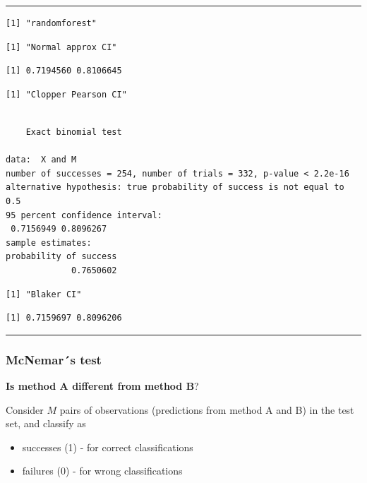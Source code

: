 \documentclass[
  letterpaper,
  DIV=11,
  numbers=noendperiod]{scrartcl}
\providecommand{\tightlist}{%
  \setlength{\itemsep}{0pt}\setlength{\parskip}{0pt}}\usepackage{longtable,booktabs,array}
\begin{document}
\begin{center}\rule{0.5\linewidth}{0.5pt}\end{center}

\footnotesize

\begin{verbatim}
[1] "randomforest"
\end{verbatim}

\begin{verbatim}
[1] "Normal approx CI"
\end{verbatim}

\begin{verbatim}
[1] 0.7194560 0.8106645
\end{verbatim}

\begin{verbatim}
[1] "Clopper Pearson CI"
\end{verbatim}

\begin{verbatim}

    Exact binomial test

data:  X and M
number of successes = 254, number of trials = 332, p-value < 2.2e-16
alternative hypothesis: true probability of success is not equal to 0.5
95 percent confidence interval:
 0.7156949 0.8096267
sample estimates:
probability of success 
             0.7650602 
\end{verbatim}

\begin{verbatim}
[1] "Blaker CI"
\end{verbatim}

\begin{verbatim}
[1] 0.7159697 0.8096206
\end{verbatim}

\begin{center}\rule{0.5\linewidth}{0.5pt}\end{center}

\hypertarget{mcnemars-test}{%
\subsubsection{McNemar´s test}\label{mcnemars-test}}

\textbf{Is method A different from method B}?

Consider \(M\) pairs of observations (predictions from method A and B)
in the test set, and classify as

\begin{itemize}
\tightlist
\item
  successes (1) - for correct classifications\\
\item
  failures (0) - for wrong classifications
\end{itemize}
\end{document}
